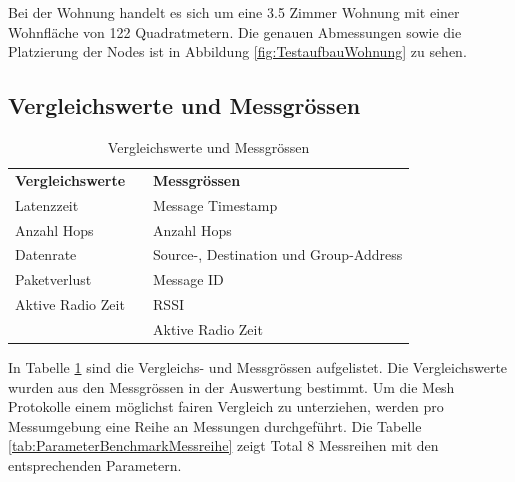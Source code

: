 Bei der Wohnung handelt es sich um eine 3.5 Zimmer Wohnung mit einer Wohnfläche von 122 Quadratmetern. Die genauen Abmessungen sowie die Platzierung der Nodes ist in Abbildung \ref{fig:TestaufbauWohnung} zu sehen.

\vspace{20mm}
\subsection{Vergleichswerte und Messgrössen}\label{subsec:VergleichswerteundMessgrössenMesh}
\begin{table}
	\centering
	\vspace{10pt}
	\begin{adjustbox}{width=0.6\textwidth}
		\begin{tabular}{ll|l|}
			\cline{1-1} \cline{3-3}
			\multicolumn{1}{|l|}{\textbf{Vergleichswerte}} &  & \textbf{Messgrössen}                   \\ \cline{1-1} \cline{3-3} 
			\multicolumn{1}{|l|}{Latenzzeit}               &  & Message Timestamp                      \\ \cline{1-1} \cline{3-3} 
			\multicolumn{1}{|l|}{Anzahl Hops}              &  & Anzahl Hops                            \\ \cline{1-1} \cline{3-3} 
			\multicolumn{1}{|l|}{Datenrate}                &  & Source-, Destination und Group-Address \\ \cline{1-1} \cline{3-3} 
			\multicolumn{1}{|l|}{Paketverlust}             &  & Message ID                             \\ \cline{1-1} \cline{3-3} 
			\multicolumn{1}{|l|}{Aktive Radio Zeit}        &  & RSSI                                   \\ \cline{1-1} \cline{3-3} 
			&  & Aktive Radio Zeit                      \\ \cline{3-3} 
		\end{tabular}
	\end{adjustbox}
	\caption{Vergleichswerte und Messgrössen}
	\label{tab:VergleichswerteMessgrössen}
	\vspace{5pt}
\end{table}
In Tabelle \ref{tab:VergleichswerteMessgrössen} sind die Vergleichs- und Messgrössen aufgelistet. Die Vergleichswerte wurden aus den Messgrössen in der Auswertung bestimmt. Um die Mesh Protokolle einem möglichst fairen Vergleich zu unterziehen, werden pro Messumgebung eine Reihe an Messungen durchgeführt. Die Tabelle \ref{tab:ParameterBenchmarkMessreihe} zeigt Total 8 Messreihen mit den entsprechenden Parametern.
